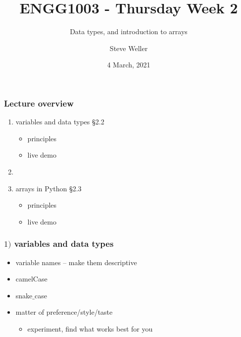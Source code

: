 \documentclass[14pt]{beamer}
\title{ENGG1003 - Thursday Week 2}
\subtitle{Data types, and introduction to arrays}
\author{Steve Weller}
\institute{University of Newcastle}
\date{4 March, 2021}
\newcommand\red[1]{{\color{red} #1}}
\begin{document}
\framebreak


\begin{frame}[fragile]

\frametitle{Lecture overview}
\begin{enumerate}
	\item variables and data types \red{\S2.2}
	\begin{itemize}
		\item principles
		\item live demo
	\end{itemize}

	\item[]
	
	\item arrays in Python \red{\S2.3}
		\begin{itemize}
			\item principles
			\item live demo
		\end{itemize}

\end{enumerate}

\end{frame}



\begin{frame}[fragile]

\frametitle{$1)$ variables and data types}

\begin{itemize}
	\item variable names -- make them descriptive
	\item camelCase
	\item snake$\_$case
	\item matter of preference/style/taste
		\begin{itemize}
			\item experiment, find what works best for you %
		\end{itemize}
\end{itemize}

\end{frame}
\end{document}
